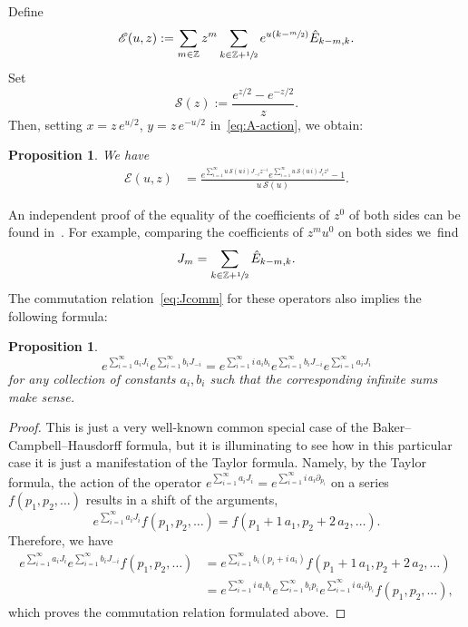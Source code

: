 \documentclass[11pt]{article}
\newcommand{\skpt}{\smallskip}
\let\mathcal\mathscr
\theoremstyle{plain}
\newtheorem{proposition}[theorem]{Proposition}
\theoremstyle{definition}
\theoremstyle{remark}
\newcommand{\Z}{\mathbb{Z}}
\newcommand{\cS}{\mathcal{S}}
\newcommand{\cE}{\mathcal{E}}
\begin{document}
Define
\begin{equation}\label{eq:cEdef}
\cE(u,z):=\sum_{m\in\Z}z^m \sum_{k\in\Z+\sfrac{1}{2}}
e^{u(k-\sfrac{m}{2})} \hat{E}_{k-m,k}.
\end{equation}
Set
\begin{equation}\label{eq:Sdef}
\mathcal{S}(z):= \dfrac{e^{z/2}-e^{-z/2}}{z}.
\end{equation}
Then, setting $x=z\,e^{u/2}$, $y=z\,e^{-u/2}$ in~\eqref{eq:A-action}, we obtain:

\begin{proposition} We have
\begin{align}\label{eq:cEform}
\cE(u,z)
&=\frac{
e^{\sum_{i=1}^\infty u\,\cS(u\,i) J_{-i}z^{-i}}
e^{\sum_{i=1}^\infty u\,\cS(u\,i) J_{i}z^{i}} -1 }
{u\,\cS(u)}.
\end{align}
\end{proposition}

An independent proof of the equality of the coefficients of $z^0$ of both sides can be found in~\cite{SSZ12}.
For example, comparing the coefficients of $z^mu^0$ on both sides we~find
\begin{equation*}
J_m=\sum_{k\in\Z+\sfrac{1}{2}}\hat E_{k-m,k}.
\end{equation*}
The commutation relation~\eqref{eq:Jcomm} for these operators also implies the following formula:

\skpt
\begin{proposition}\mbox{}\vspace*{-1.2\baselineskip}
\begin{equation}\label{eq:expJcomm}
e^{\sum_{i=1}^\infty a_i J_i}
e^{\sum_{i=1}^\infty b_i J_{-i}}=
e^{\sum_{i=1}^\infty i \,a_ib_i}
e^{\sum_{i=1}^\infty b_i J_{-i}}
e^{\sum_{i=1}^\infty a_i J_i}
\end{equation}
for any collection of constants $a_i,b_i$ such that the corresponding infinite sums make sense.
\end{proposition}

\begin{proof}
This is just a very well-known common special case of the Baker--Campbell--Hausdorff formula, but it is illuminating to see how in this particular case it is just a manifestation of the Taylor formula. Namely, by the Taylor formula, the action of the operator $e^{\sum_{i=1}^\infty a_i J_i}=e^{\sum_{i=1}^\infty i\,a_i \partial_{p_i}}$ on a series $f(p_1,p_2,\dots)$ results in a shift of the arguments,
\begin{equation*}
e^{\sum_{i=1}^\infty a_i J_i}f(p_1,p_2,\dots)
=f(p_1+1\,a_1,p_2+2\,a_2,\dots).
\end{equation*}
Therefore, we have
\begin{align*}
e^{\sum_{i=1}^\infty a_i J_i}
e^{\sum_{i=1}^\infty b_i J_{-i}}f(p_1,p_2,\dots)&=
e^{\sum_{i=1}^\infty b_i (p_i+i\,a_i)}
f(p_1+1\,a_1,p_2+2\,a_2,\dots)
\\ &
=e^{\sum_{i=1}^\infty i\,a_ib_i}
e^{\sum_{i=1}^\infty b_i p_i}
e^{\sum_{i=1}^\infty i\,a_i \partial_{p_i}}f(p_1,p_2,\dots),
\end{align*}
which proves the commutation relation formulated above.
\end{proof}
\end{document}

